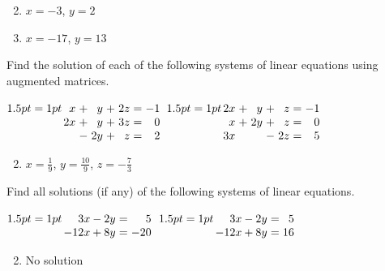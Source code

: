 \begin{multicols}{2}
\begin{ex}
\begin{sol}
\begin{enumerate}[label={\alph*.}]
\setcounter{enumi}{1}
\item  $x = -3$, $y = 2$
\setcounter{enumi}{3}
\item  $x = -17$, $y = 13$
\end{enumerate}
\end{sol}
\end{ex}

\begin{ex}
Find the solution of each of the following systems of linear equations using augmented matrices.

\begin{exenumerate}
\exitem
$\arraycolsep=1pt
\begin{array}[t]{rlrlrcr}
	 x & + & y & + & 2z & = & -1 \\
	2x & + & y & + & 3z & = & 0 \\
	   & - & 2y& + &  z & = & 2
\end{array}$
\exitem 
$\arraycolsep=1pt
\begin{array}[t]{rlrlrcr}
	2x & + & y & + & z & = & -1 \\
	 x & + & 2y & + & z & = & 0 \\
	3x &  & & - &  2z & = & 5
\end{array}$
\end{exenumerate}
\begin{sol}
\begin{enumerate}[label={\alph*.}]
\setcounter{enumi}{1}
\item  $ x = \frac{1}{9}$, $y = \frac{10}{9}$, $z = -\frac{7}{3}$

\end{enumerate}
\end{sol}
\end{ex}

\begin{ex}
Find all solutions (if any) of the following systems of linear equations.

\begin{exenumerate}
\exitem 
$\arraycolsep=1pt
\begin{array}[t]{rcr}
3x - 2y & = & 5 \\
-12x + 8y & = & - 20
\end{array}$
\exitem 
$\arraycolsep=1pt
\begin{array}[t]{rcr}
3x - 2y & = & 5 \\
-12x + 8y & = & 16
\end{array}$
\end{exenumerate}
\begin{sol}
\begin{enumerate}[label={\alph*.}]
\setcounter{enumi}{1}
\item  No solution


\end{enumerate}
\end{sol}
\end{ex}
\end{multicols}

